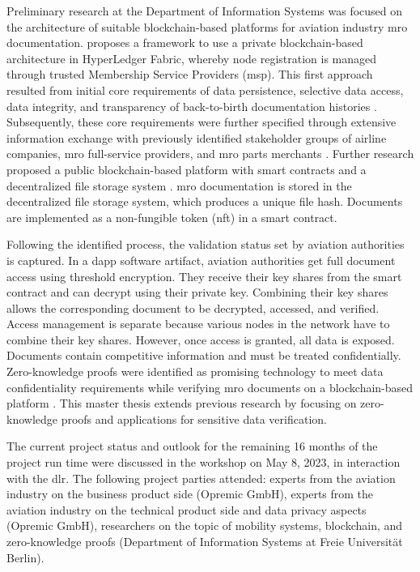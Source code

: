 Preliminary research at the Department of Information Systems was focused on the architecture of suitable blockchain-based platforms for aviation industry \acrshort{mro} documentation. \citet{WickboldtMeiseKliewer} proposes a framework to use a private blockchain-based architecture in HyperLedger Fabric, whereby node registration is managed through trusted Membership Service Providers (\acrshort{msp}). This first approach resulted from initial core requirements of data persistence, selective data access, data integrity, and transparency of back-to-birth documentation histories \citep{WickboldtClemens2018BzdD}. Subsequently, these core requirements were further specified through extensive information exchange with previously identified stakeholder groups of airline companies, \acrshort{mro} full-service providers, and \acrshort{mro} parts merchants \citep{ZedelJ}. Further research proposed a public blockchain-based platform with smart contracts and a decentralized file storage system \citep{ZedelJ}. \acrshort{mro} documentation is stored in the decentralized file storage system, which produces a unique file hash. Documents are implemented as a non-fungible token (\acrshort{nft}) in a smart contract.

Following the identified process, the validation status set by aviation authorities is captured. In a \acrshort{dapp} software artifact, aviation authorities get full document access using threshold encryption. They receive their key shares from the smart contract and can decrypt using their private key. Combining their key shares allows the corresponding document to be decrypted, accessed, and verified. Access management is separate because various nodes in the network have to combine their key shares. However, once access is granted, all data is exposed. Documents contain competitive information and must be treated confidentially. Zero-knowledge proofs were identified as promising technology to meet data confidentiality requirements while verifying \acrshort{mro} documents on a blockchain-based platform \citep{ZedelJ}. This master thesis extends previous research by focusing on zero-knowledge proofs and applications for sensitive data verification.

The current project status and outlook for the remaining 16 months of the project run time were discussed in the workshop on May 8, 2023, in interaction with the \acrshort{dlr}. The following project parties attended: experts from the aviation industry on the business product side (Opremic GmbH), experts from the aviation industry on the technical product side and data privacy aspects (Opremic GmbH), researchers on the topic of mobility systems, blockchain, and zero-knowledge proofs (Department of Information Systems at Freie Universit{\"a}t Berlin). 

